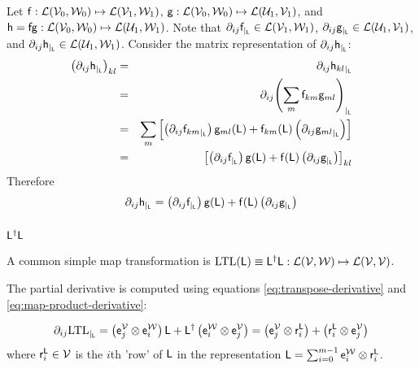 Let
$\mathsf{f} : \mathcal{L}(\mathcal{V}_0,\mathcal{W}_0) \mapsto \mathcal{L}(\mathcal{V}_1,\mathcal{W}_1)$,
$\mathsf{g} : \mathcal{L}(\mathcal{V}_0,\mathcal{W}_0) \mapsto \mathcal{L}(\mathcal{U}_1,\mathcal{V}_1)$,
and
$\mathsf{h} = \mathsf{f}\mathsf{g} : \mathcal{L}(\mathcal{V}_0,\mathcal{W}_0) \mapsto \mathcal{L}(\mathcal{U}_1,\mathcal{W}_1)$.
Note that
${\partial}_{ij}{\mathsf{f}}_{\mid_{\mathsf{L}}} \in  \mathcal{L}(\mathcal{V}_1,\mathcal{W}_1)$,
${\partial}_{ij}{\mathsf{g}}_{\mid_{\mathsf{L}}} \in  \mathcal{L}(\mathcal{U}_1,\mathcal{V}_1)$,
and
${\partial}_{ij}{\mathsf{h}}_{\mid_{\mathsf{L}}} \in  \mathcal{L}(\mathcal{U}_1,\mathcal{W}_1)$.
Consider the matrix representation of ${\partial}_{ij}{\mathsf{h}}_{\mid_{\mathsf{L}}}$:
\begin{eqnarray}
\left( {\partial}_{ij}{\mathsf{h}}_{\mid_{\mathsf{L}}} \right)_{kl}
& = &
{\partial}_{ij}{\mathsf{h}_{kl}}_{\mid_{\mathsf{L}}}
\\
& = &
{\partial}_{ij}{\left( \sum_{m} \mathsf{f}_{km} \mathsf{g}_{ml} \right)}_{\mid_{\mathsf{L}}}
\nonumber
\\
& = &
\sum_{m}  \left[
\left( {\partial}_{ij}{\mathsf{f}_{km}}_{\mid_{\mathsf{L}}} \right) \mathsf{g}_{ml}(\mathsf{L})
+
\mathsf{f}_{km}(\mathsf{L}) \left( {\partial}_{ij}{\mathsf{g}_{ml}}_{\mid_{\mathsf{L}}} \right)
\right]
\nonumber
\\
& = &
\left[
\left( {\partial}_{ij}{\mathsf{f}}_{\mid_{\mathsf{L}}} \right) \mathsf{g}(\mathsf{L})
+
\mathsf{f}(\mathsf{L}) \left( {\partial}_{ij}{\mathsf{g}}_{\mid_{\mathsf{L}}} \right)
\right]_{kl}
\nonumber
\end{eqnarray}
Therefore
\begin{equation}
\label{eq:map-product-derivative}
{\partial}_{ij}{\mathsf{h}}_{\mid_{\mathsf{L}}}
 =
\left( {\partial}_{ij}{\mathsf{f}}_{\mid_{\mathsf{L}}} \right) \mathsf{g}(\mathsf{L})
+
\mathsf{f}(\mathsf{L}) \left( {\partial}_{ij}{\mathsf{g}}_{\mid_{\mathsf{L}}} \right)
\end{equation}


\subsubsection{$\mathsf{L}^{\dagger} \mathsf{L}$}
\label{sec:LTL}

A common simple map transformation
is $\mathrm{LTL}(\mathsf{L}) \equiv \mathsf{L}^{\dagger} \mathsf{L}
: \mathcal{L}(\mathcal{V},\mathcal{W}) \mapsto \mathcal{L}(\mathcal{V},\mathcal{V})$.

The partial derivative is computed using equations
\ref{eq:transpose-derivative}
and
\ref{eq:map-product-derivative}:

\begin{equation}
{\partial}_{ij}{\mathrm{LTL}}_{\mid_{\mathsf{L}}}
=
\left( \mathsf{e}_j^{\mathcal{V}} \otimes \mathsf{e}_i^{\mathcal{W}} \right) \mathsf{L}
+
\mathsf{L}^{\dagger} \left( \mathsf{e}_i^{\mathcal{W}} \otimes \mathsf{e}_j^{\mathcal{V}} \right)
=
\left( \mathsf{e}_j^{\mathcal{V}} \otimes \mathsf{r}_i^{\mathsf{L}} \right)
+
\left( \mathsf{r}_i^{\mathsf{L}} \otimes \mathsf{e}_j^{\mathcal{V}} \right)
\end{equation}
where $\mathsf{r}_i^{\mathsf{L}} \in \mathcal{V}$ is the $i$th 'row' of $\mathsf{L}$
in the representation $\mathsf{L} = \sum_{i=0}^{m-1} \mathsf{e}_i^{\mathcal{W}} \otimes \mathsf{r}_i^{\mathsf{L}}$.

